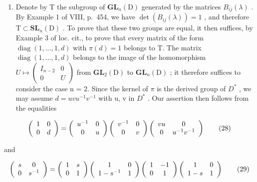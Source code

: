 \begin{enumerate}
\def\labelenumi{\Alph{enumi})}
\tightlist
\item
  Denote by T the subgroup of \(\mathbf{GL}_{n}(\mathrm{D})\) generated by the matrices \(B_{ij}(\lambda)\) . By Example 1 of VIII, p.~454, we have \(\det(B_{ij}(\lambda)) = 1\) , and therefore \(\mathrm{T} \subset \mathbf{SL}_{n}(\mathrm{D})\) . To prove that these two groups are equal, it then suffices, by Example 3 of loc. cit., to prove that every matrix of the form \(\operatorname{diag}(1, \ldots, 1, d)\) with \(\pi(d) = 1\) belongs to T. The matrix \(\operatorname{diag}(1, \ldots, 1, d)\) belongs to the image of the homomorphism \(U \mapsto \begin{pmatrix} I_{n-2} & 0 \\ 0 & U \end{pmatrix}\) from \(\mathbf{GL}_{2}(\mathrm{D})\) to \(\mathbf{GL}_{n}(\mathrm{D})\) ; it therefore suffices to consider the case n = 2. Since the kernel of \(\pi\) is the derived group of \(D^{*}\) , we may assume \(d = uvu^{-1}v^{-1}\) with u, v in \(D^{*}\) . Our assertion then follows from the equalities
\end{enumerate}

\[
\left( \begin{array}{c c} 1 & 0 \\ 0 & d \end{array} \right) = \left( \begin{array}{c c} u ^ {- 1} & 0 \\ 0 & u \end{array} \right) \left( \begin{array}{c c} v ^ {- 1} & 0 \\ 0 & v \end{array} \right) \left( \begin{array}{c c} v u & 0 \\ 0 & u ^ {- 1} v ^ {- 1} \end{array} \right)\tag{28}
\]

and

\[
\left( \begin{array}{c c} s & 0 \\ 0 & s ^ {- 1} \end{array} \right) = \left( \begin{array}{c c} 1 & s \\ 0 & 1 \end{array} \right) \left( \begin{array}{c c} 1 & 0 \\ 1 - s ^ {- 1} & 1 \end{array} \right) \left( \begin{array}{c c} 1 & - 1 \\ 0 & 1 \end{array} \right) \left( \begin{array}{c c} 1 & 0 \\ 1 - s & 1 \end{array} \right)\tag{29}
\]

